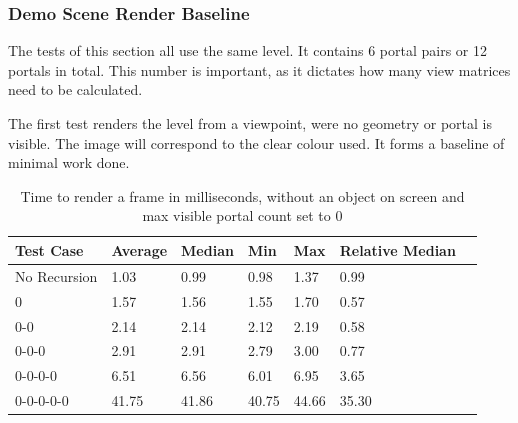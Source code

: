 \subsubsection{Demo Scene Render Baseline}
The tests of this section all use the same level. It contains 6 portal pairs or 12 portals in total. This number is important, as it dictates how many view matrices need to be calculated.

The first test renders the level from a viewpoint, were no geometry or portal is visible. The image will correspond to the clear colour used. It forms a baseline of minimal work done.

\begin{table}[H]
	\centering
	\label{tab:baseline}
	\begin{tabular}{|l|l|l|l|l|l|l|}
		\hline
		Test Case    & Average & Median & Min   & Max   & Relative Median \\ \hline
		No Recursion & 1.03    & 0.99   & 0.98  & 1.37  & 0.99            \\ \hline
		0            & 1.57    & 1.56   & 1.55  & 1.70  & 0.57            \\ \hline
		0-0          & 2.14    & 2.14   & 2.12  & 2.19  & 0.58            \\ \hline
		0-0-0        & 2.91    & 2.91   & 2.79  & 3.00  & 0.77            \\ \hline
		0-0-0-0      & 6.51    & 6.56   & 6.01  & 6.95  & 3.65            \\ \hline
		0-0-0-0-0    & 41.75   & 41.86  & 40.75 & 44.66 & 35.30           \\ \hline        
	\end{tabular}
	\caption{Time to render a frame in milliseconds, without an object on screen and max visible portal count set to 0}
\end{table}

